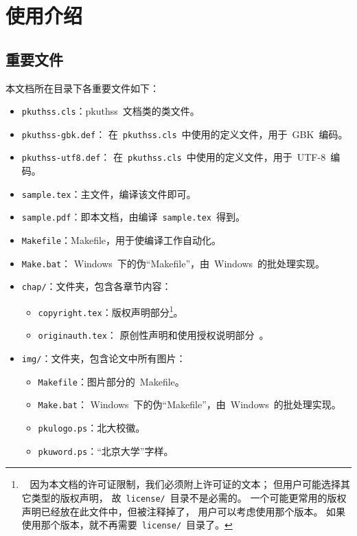 \chapter{使用介绍}
	\section{重要文件}

	本文档所在目录下各重要文件如下：
	\begin{itemize}\denselist
		\item \verb|pkuthss.cls|：pkuthss~文档类的类文件。
		\item \verb|pkuthss-gbk.def|：
			在~\verb|pkuthss.cls|~中使用的定义文件，用于~GBK~编码。
		\item \verb|pkuthss-utf8.def|：
			在~\verb|pkuthss.cls|~中使用的定义文件，用于~UTF-8~编码。
		\item \verb|sample.tex|：主文件，编译该文件即可。
		\item \verb|sample.pdf|：即本文档，由编译~\verb|sample.tex|~得到。
		\item \verb|Makefile|：Makefile，用于使编译工作自动化。
		\item \verb|Make.bat|：%
			Windows~下的伪“Makefile”，由~Windows~的批处理实现。
		\item \verb|chap/|：文件夹，包含各章节内容：
		\begin{itemize}\denselist
			\item \verb|copyright.tex|：版权声明部分\footnote%
			{\ %
				因为本文档的许可证限制，我们必须附上许可证的文本；
				但用户可能选择其它类型的版权声明，
				故~\texttt{license/}\linebreak[1]~目录不是必需的。
				一个可能更常用的版权声明已经放在此文件中，但被注释掉了，
				用户可以考虑使用那个版本。
				如果使用那个版本，就不再需要~\texttt{license/}~目录了。
			}。
			\item \verb|originauth.tex|：
				原创性声明和使用授权说明部分~\supercite{F11}。
		\end{itemize}
		\item \verb|img/|：文件夹，包含论文中所有图片：
		\begin{itemize}\denselist
			\item \verb|Makefile|：图片部分的~Makefile。
			\item \verb|Make.bat|：%
				Windows~下的伪“Makefile”，由~Windows~的批处理实现。
			\item \verb|pkulogo.ps|：北大校徽。
			\item \verb|pkuword.ps|：“北京大学”字样。
		\end{itemize}
	\end{itemize}

